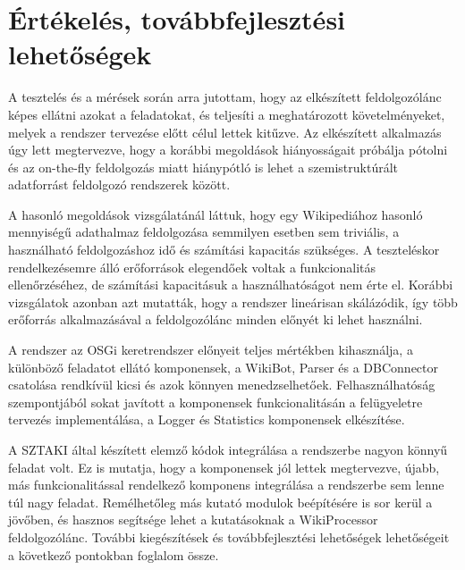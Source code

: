 \chapter{Értékelés, továbbfejlesztési lehetőségek}
\label{cha:ending}

A tesztelés és a mérések során arra jutottam, hogy az elkészített feldolgozólánc képes ellátni azokat a feladatokat, és teljesíti a meghatározott követelményeket, melyek a rendszer tervezése előtt célul lettek kitűzve. Az elkészített alkalmazás úgy lett megtervezve, hogy a korábbi megoldások hiányosságait próbálja pótolni és az on-the-fly feldolgozás miatt hiánypótló is lehet a szemistruktúrált adatforrást feldolgozó rendszerek között.

A hasonló megoldások vizsgálatánál láttuk, hogy egy Wikipediához hasonló mennyiségű adathalmaz feldolgozása semmilyen esetben sem triviális, a használható feldolgozáshoz idő és számítási kapacitás szükséges. A teszteléskor rendelkezésemre álló erőforrások elegendőek voltak a funkcionalitás ellenőrzéséhez, de számítási kapacitásuk a használhatóságot nem érte el. Korábbi vizsgálatok azonban azt mutatták, hogy a rendszer lineárisan skálázódik, így több erőforrás alkalmazásával a feldolgozólánc minden előnyét ki lehet használni.

A rendszer az OSGi keretrendszer előnyeit teljes mértékben kihasználja, a különböző feladatot ellátó komponensek, a WikiBot, Parser és a DBConnector csatolása rendkívül kicsi és azok könnyen menedzselhetőek. Felhasználhatóság szempontjából sokat javított a komponensek funkcionalitásán a felügyeletre tervezés implementálása, a Logger és Statistics komponensek elkészítése.

A SZTAKI által készített elemző kódok integrálása a rendszerbe nagyon könnyű feladat volt. Ez is mutatja, hogy a komponensek jól lettek megtervezve, újabb, más funkcionalitással rendelkező komponens integrálása a rendszerbe sem lenne túl nagy feladat. Remélhetőleg más kutató modulok beépítésére is sor kerül a jövőben, és hasznos segítsége lehet a kutatásoknak a WikiProcessor feldolgozólánc. További kiegészítések és továbbfejlesztési lehetőségek lehetőségeit a következő pontokban foglalom össze.


